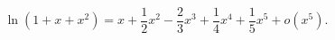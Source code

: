 \[
 \ln(1 + x + x^2) 
 = x + \frac{1}{2}x^2 - \frac{2}{3}x^3 + \frac{1}{4}x^4 + \frac{1}{5}x^5 + o(x^5) .
\]
